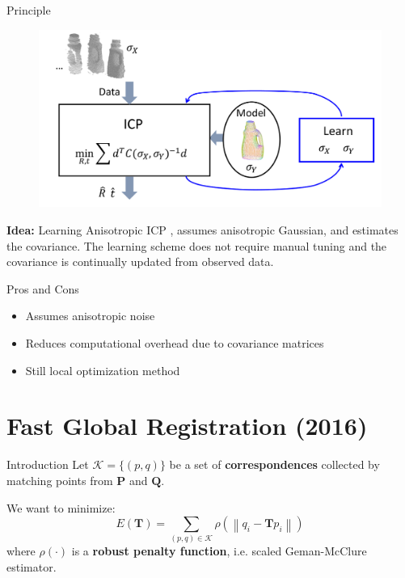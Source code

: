 \documentclass[aspectratio=1610]{beamer}
\newcommand*\pro{%
  \item[\color{ProGreen}\scalebox{1.5}{\faThumbsOUp}]}
\newcommand*\con{%
  \item[\color{ConRed}\scalebox{1.5}{\faThumbsODown}]}
\renewcommand*{\cite}{\parencite}
\newcommand{\norm}[1]{\left\lVert#1\right\rVert}
\begin{document}
\begin{frame}{Principle}

\begin{figure}[htbp]
\begin{center}
  \includegraphics[height=0.5\textheight,keepaspectratio]{imgs/LAICP.png}
  \label{fig:LAICP}
\end{center}
\end{figure}
\textbf{Idea:} Learning Anisotropic ICP \cite{lee2016learning}, assumes anisotropic Gaussian, and estimates the covariance. The learning scheme does not require manual tuning and the covariance is continually updated from observed data.
\end{frame}


\begin{frame}{Pros and Cons}
\begin{itemize}[wide, labelsep=2em]
\setlength\itemsep{1em}
\pro Assumes anisotropic noise
\pro Reduces computational overhead due to covariance matrices
\con Still local optimization method
\end{itemize}
\end{frame}

\section{Fast Global Registration (2016)}
\begin{frame}{Introduction}
Let $\mathcal{K}=\{(p,q)\}$ be a set of \textbf{correspondences} collected by matching points from $\bm{P}$ and $\bm{Q}$.%

We want to minimize:
\begin{equation}
\label{eq:fastgo_obj}
E(\bm{T})=\sum_{(p,q)\in\mathcal{K}}\rho({\norm{q_i-\bm{T}p_i}})
\end{equation}
where $\rho(\cdot)$ is a \textbf{robust penalty function}, i.e. \alert{scaled Geman-McClure estimator}.
\end{frame}
\end{document}
